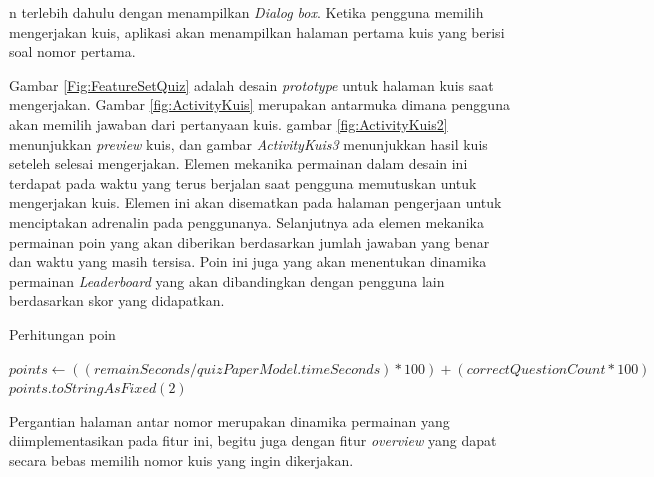 n terlebih dahulu dengan menampilkan \textit{Dialog box}.
Ketika pengguna memilih mengerjakan kuis, aplikasi akan menampilkan halaman pertama kuis yang berisi soal nomor pertama.

Gambar \ref*{Fig:FeatureSetQuiz} adalah desain \textit{prototype} untuk halaman kuis saat mengerjakan.
Gambar \ref*{fig:ActivityKuis} merupakan antarmuka dimana pengguna akan memilih jawaban dari pertanyaan kuis.
gambar \ref*{fig:ActivityKuis2} menunjukkan \textit{preview} kuis, dan gambar \textit{ActivityKuis3} menunjukkan hasil kuis seteleh selesai mengerjakan.
Elemen mekanika permainan dalam desain ini terdapat pada waktu yang terus berjalan saat pengguna memutuskan untuk mengerjakan kuis. Elemen ini akan disematkan pada halaman pengerjaan untuk menciptakan adrenalin pada penggunanya.
Selanjutnya ada elemen mekanika permainan poin yang akan diberikan berdasarkan jumlah jawaban yang benar dan waktu yang masih tersisa.
Poin ini juga yang akan menentukan dinamika permainan \textit{Leaderboard} yang akan dibandingkan dengan pengguna lain berdasarkan skor yang didapatkan.
\begin{algorithm}[H]
    \caption{Perhitungan poin}
	\begin{algorithmic}
		  \State $points \gets ((remainSeconds / quizPaperModel.timeSeconds) * 100) + (correctQuestionCount * 100)$
		  \State \Return $points.toStringAsFixed(2)$
		\EndFunction
		\end{algorithmic}
\end{algorithm}
Pergantian halaman antar nomor merupakan dinamika permainan yang diimplementasikan pada fitur ini, begitu juga dengan fitur \textit{overview} yang dapat secara bebas memilih nomor kuis yang ingin dikerjakan.

